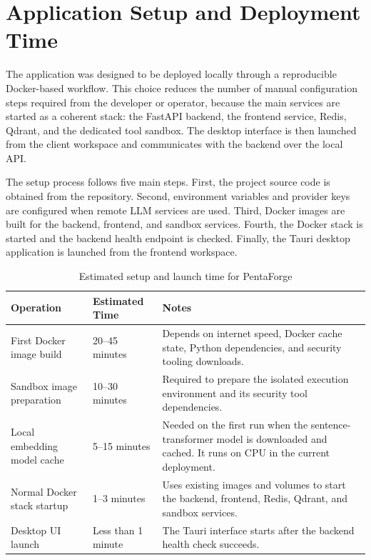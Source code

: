 \documentclass[12pt,a4paper]{report}
\begin{document}
\section{Application Setup and Deployment Time}

The application was designed to be deployed locally through a reproducible
Docker-based workflow. This choice reduces the number of manual configuration steps
required from the developer or operator, because the main services are started as a
coherent stack: the FastAPI backend, the frontend service, Redis, Qdrant, and the
dedicated tool sandbox. The desktop interface is then launched from the client
workspace and communicates with the backend over the local API.

The setup process follows five main steps. First, the project source code is obtained
from the repository. Second, environment variables and provider keys are configured
when remote LLM services are used. Third, Docker images are built for the backend,
frontend, and sandbox services. Fourth, the Docker stack is started and the backend
health endpoint is checked. Finally, the Tauri desktop application is launched from
the frontend workspace.

\begin{table}[H]
    \centering
    \renewcommand{\arraystretch}{1.35}
    \begin{tabular}{|p{}|p{}|p{}|}
        \hline
        \textbf{Operation} & \textbf{Estimated Time} & \textbf{Notes} \\
        \hline
        First Docker image build & 20--45 minutes & Depends on internet speed,
        Docker cache state, Python dependencies, and security tooling downloads. \\
        \hline
        Sandbox image preparation & 10--30 minutes & Required to prepare the isolated
        execution environment and its security tool dependencies. \\
        \hline
        Local embedding model cache & 5--15 minutes & Needed on the first run when
        the sentence-transformer model is downloaded and cached. It runs on CPU in the
        current deployment. \\
        \hline
        Normal Docker stack startup & 1--3 minutes & Uses existing images and volumes
        to start the backend, frontend, Redis, Qdrant, and sandbox services. \\
        \hline
        Desktop UI launch & Less than 1 minute & The Tauri interface starts after the
        backend health check succeeds. \\
        \hline
    \end{tabular}
     \caption{Estimated setup and launch time for PentaForge}
    \label{tab:setup_time}
\end{table}
\end{document}
